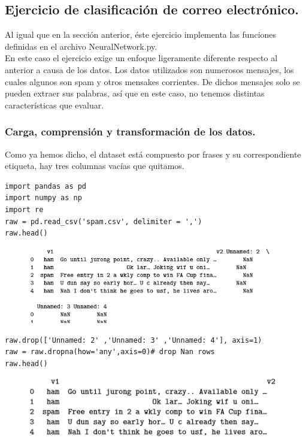 \documentclass[a4paper,10pt]{article}
\begin{document}
\subsection{Ejercicio de clasificación de correo electrónico.}
Al igual que en la sección anterior, éste ejercicio implementa las funciones definidas en el archivo NeuralNetwork.py.\\ En este caso el ejercicio exige un enfoque ligeramente diferente respecto al anterior a causa de los datos. Los datos utilizados son numerosos mensajes, los cuales algunos son spam y otros mensakes corrientes. De dichos mensajes solo se pueden extraer sus palabras, así que en este caso, no tenemos distintas características que evaluar.


\subsubsection{Carga, comprensión y transformación de los datos.}
Como ya hemos dicho, el dataset está compuesto por frases y su correspondiente etiqueta, hay tres columnas vacías que quitamos.
\begin{lstlisting}
import pandas as pd
import numpy as np
import re
raw = pd.read_csv('spam.csv', delimiter = ',')
raw.head()
\end{lstlisting}
\begin{figure}[H]
\centering
\includegraphics[scale=0.9]{Annotation 2020-03-23 174228.png}
\end{figure}
\begin{lstlisting}
raw.drop(['Unnamed: 2' ,'Unnamed: 3' ,'Unnamed: 4'], axis=1)
raw = raw.dropna(how='any',axis=0)# drop Nan rows
raw.head()
\end{lstlisting}
\begin{figure}[H]
\centering
\includegraphics{Annotation 2020-03-23 174341.png}
\end{figure}
\end{document}
